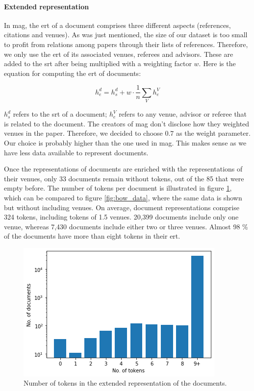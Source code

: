 \paragraph{Extended representation} \mbox{}

In \acrshort{mag}, the \acrshort{ert} of a document comprises three different aspects (references, citations and venues). As was just mentioned, the size of our dataset is too small to profit from relations among papers through their lists of references. Therefore, we only use the \acrshort{ert} of its associated venues, referees and advisors. These are added to the \acrshort{srt} after being multiplied with a weighting factor $w$. Here is the equation for computing the \acrshort{ert} of documents:

$$ h_e^d = h_s^d + w \cdot \frac{1}{n} \sum_V h_e^V $$

$h_s^d$ refers to the \acrshort{srt} of a document; $h_e^V$ refers to any venue, advisor or referee that is related to the document. The creators of \acrshort{mag} don't disclose how they weighted venues in the paper. Therefore, we decided to choose $0.7$ as the weight parameter. Our choice is probably higher than the one used in \acrshort{mag}. This makes sense as we have less data available to represent documents.

Once the representations of documents are enriched with the representations of their venues, only 33 documents remain without tokens, out of the 85 that were empty before. The number of tokens per document is illustrated in figure \ref{fig:doc_representations}, which can be compared to figure \ref{fig:bow_data}, where the same data is shown but without including venues. On average, document representations comprise 324 tokens, including tokens of 1.5 venues. 20,399 documents include only one venue, whereas 7,430 documents include either two or three venues. Almost 98 \% of the documents have more than eight tokens in their \acrshort{ert}.

\begin{figure}
    \centering
    \includegraphics[width=.7\textwidth]{figures/unsupervised_approach/doc_representations.png}
    \caption{Number of tokens in the extended representation of the documents.}
    \label{fig:doc_representations}
\end{figure}

